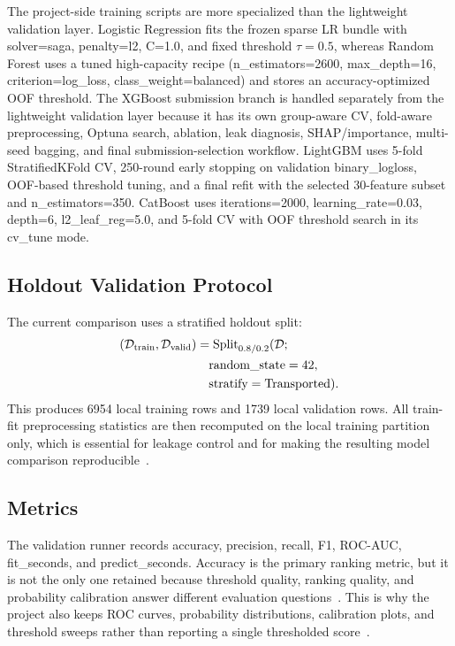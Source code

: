\documentclass[conference]{IEEEtran}
\renewcommand{\texttt}[1]{\textnormal{#1}}
\begin{document}
The project-side training scripts are more specialized than the lightweight validation layer. Logistic Regression fits the frozen sparse LR bundle with \texttt{solver=saga}, \texttt{penalty=l2}, \texttt{C=1.0}, and fixed threshold $\tau=0.5$, whereas Random Forest uses a tuned high-capacity recipe (\texttt{n\_estimators=2600}, \texttt{max\_depth=16}, \texttt{criterion=log\_loss}, \texttt{class\_weight=balanced}) and stores an accuracy-optimized OOF threshold. The XGBoost submission branch is handled separately from the lightweight validation layer because it has its own group-aware CV, fold-aware preprocessing, Optuna search, ablation, leak diagnosis, SHAP/importance, multi-seed bagging, and final submission-selection workflow. LightGBM uses 5-fold \texttt{StratifiedKFold} CV, 250-round early stopping on validation \texttt{binary\_logloss}, OOF-based threshold tuning, and a final refit with the selected 30-feature subset and \texttt{n\_estimators=350}. CatBoost uses \texttt{iterations=2000}, \texttt{learning\_rate=0.03}, \texttt{depth=6}, \texttt{l2\_leaf\_reg=5.0}, and 5-fold CV with OOF threshold search in its \texttt{cv\_tune} mode.

\subsection{Holdout Validation Protocol}
The current comparison uses a stratified holdout split:
\begin{equation}
\begin{aligned}
(\mathcal{D}_{\mathrm{train}}, \mathcal{D}_{\mathrm{valid}})
&= \operatorname{Split}_{0.8/0.2}(\mathcal{D}; \\
&\quad \texttt{random\_state}=42, \\
&\quad \texttt{stratify}=\texttt{Transported}).
\end{aligned}
\label{eq:holdout_split}
\end{equation}
This produces 6954 local training rows and 1739 local validation rows. All train-fit preprocessing statistics are then recomputed on the local training partition only, which is essential for leakage control and for making the resulting model comparison reproducible~\cite{kapoor2023leakage,kapoor2024reforms}.

\subsection{Metrics}
The validation runner records
\texttt{accuracy}, \texttt{precision}, \texttt{recall}, \texttt{F1}, \texttt{ROC-AUC}, \texttt{fit\_seconds}, and \texttt{predict\_seconds}. Accuracy is the primary ranking metric, but it is not the only one retained because threshold quality, ranking quality, and probability calibration answer different evaluation questions~\cite{silva2023calibration,lee2023tcal}. This is why the project also keeps ROC curves, probability distributions, calibration plots, and threshold sweeps rather than reporting a single thresholded score~\cite{leevy2023threshold}.
\end{document}
